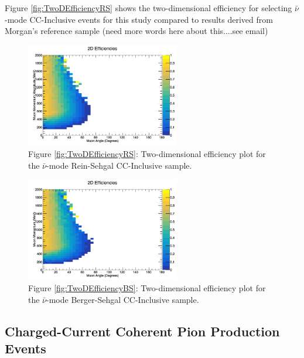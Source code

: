 \documentclass[11pt]{article}
\begin{document}
Figure \ref*{fig:TwoDEfficiencyRS} shows the two-dimensional efficiency for selecting $\bar{\nu}$-mode CC-Inclusive events for this study compared to results derived from Morgan's reference sample (need more words here about this....see email)

\begin{figure}[H]
\centering
\includegraphics[width=0.6\textwidth]{CCInclusivePlots/2DEffCompareANMRS.png}
\caption*{Figure \ref*{fig:TwoDEfficiencyRS}: Two-dimensional efficiency plot for the $\bar{\nu}$-mode Rein-Sehgal CC-Inclusive sample.}
\end{figure}\label{fig:TwoDEfficiencyRS}

\begin{figure}[H]
\centering
\includegraphics[width=0.6\textwidth]{CCInclusivePlots/2DEffCompareANMBS.png}
\caption*{Figure \ref*{fig:TwoDEfficiencyBS}: Two-dimensional efficiency plot for the $\bar{\nu}$-mode Berger-Sehgal CC-Inclusive sample.}
\end{figure}\label{fig:TwoDEfficiencyBS}



\subsection{Charged-Current Coherent Pion Production Events}\label{sub:CCCohPion}
\end{document}
